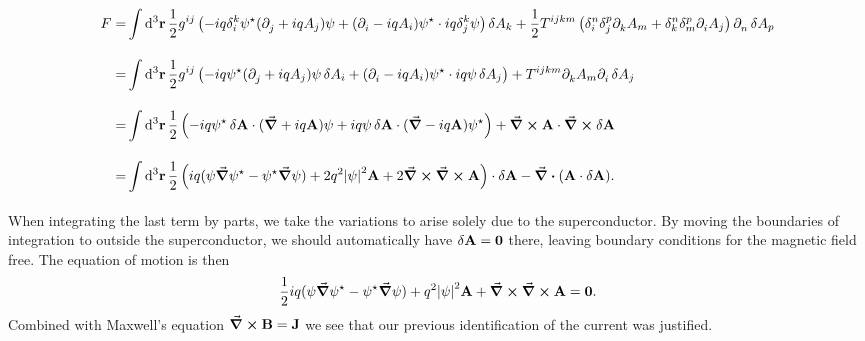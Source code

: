\begin{align*}
	F =& \inte{}{}\dd[3]{\vb{r}}\frac{1}{2}g^{ij}\left(-iq\kdelta{k}{i}\psi\cc(\del{}{j} + iqA_{j})\psi + (\del{}{i} - iqA_{i})\psi\cc\cdot iq\kdelta{k}{j}\psi\right)\var{A_{k}} + \frac{1}{2}T^{ijkm}\left(\kdelta{n}{i}\kdelta{p}{j}\del{}{k}A_{m} + \kdelta{n}{k}\kdelta{p}{m}\del{}{i}A_{j}\right)\del{}{n}\var{A_{p}} \\
	  =& \inte{}{}\dd[3]{\vb{r}}\frac{1}{2}g^{ij}\left(-iq\psi\cc(\del{}{j} + iqA_{j})\psi\var{A_{i}} + (\del{}{i} - iqA_{i})\psi\cc\cdot iq\psi\var{A_{j}}\right) + T^{ijkm}\del{}{k}A_{m}\del{}{i}\var{A_{j}} \\
	  =& \inte{}{}\dd[3]{\vb{r}}\frac{1}{2}\left(-iq\psi\cc\var{\vb{A}}\cdot(\grad{} + iq\vb{A})\psi + iq\psi\var{\vb{A}}\cdot(\grad{} - iq\vb{A})\psi\cc\right) + \curl{\vb{A}}\cdot\curl{\var{\vb{A}}} \\
	  =& \inte{}{}\dd[3]{\vb{r}}\frac{1}{2}\left(iq(\psi\grad{\psi\cc} - \psi\cc\grad{\psi}) + 2q^{2}\abs{\psi}^{2}\vb{A} + 2\curl{\curl{\vb{A}}}\right)\cdot\var{\vb{A}} - \div(\vb{A}\cdot\var{\vb{A}}).
\end{align*}
When integrating the last term by parts, we take the variations to arise solely due to the superconductor. By moving the boundaries of integration to outside the superconductor, we should automatically have $\var{\vb{A}} = \vb{0}$ there, leaving boundary conditions for the magnetic field free. The equation of motion is then
\begin{align*}
	\frac{1}{2}iq(\psi\grad{\psi\ensuremath{^{\star}}} - \psi^{\star}\grad{\psi}) + q^{2}\abs{\psi}^{2}\vb{A} + \curl{\curl{\vb{A}}} = \vb{0}.
\end{align*}
Combined with Maxwell's equation $\curl{\vb{B}} = \vb{J}$ we see that our previous identification of the current was justified.

